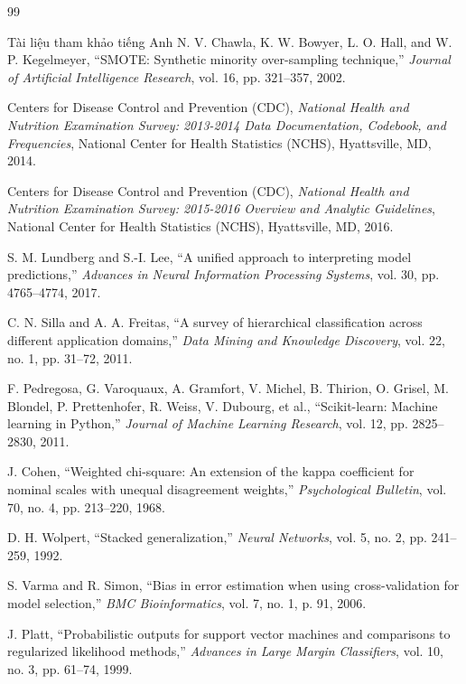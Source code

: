 \documentclass{uetgraduation}
\begin{document}
\begin{thebibliography}{99}
\begin{bibsection}{Tài liệu tham khảo tiếng Anh}
    N. V. Chawla, K. W. Bowyer, L. O. Hall, and W. P. Kegelmeyer,
    ``{SMOTE}: Synthetic minority over-sampling technique,''
    \textit{Journal of Artificial Intelligence Research}, vol. 16, pp. 321--357, 2002.

    Centers for Disease Control and Prevention (CDC),
    \textit{National Health and Nutrition Examination Survey: 2013-2014 Data Documentation, Codebook, and Frequencies},
    National Center for Health Statistics (NCHS), Hyattsville, MD, 2014.

    Centers for Disease Control and Prevention (CDC),
    \textit{National Health and Nutrition Examination Survey: 2015-2016 Overview and Analytic Guidelines},
    National Center for Health Statistics (NCHS), Hyattsville, MD, 2016.

    S. M. Lundberg and S.-I. Lee,
    ``A unified approach to interpreting model predictions,''
    \textit{Advances in Neural Information Processing Systems}, vol. 30, pp. 4765--4774, 2017.

    C. N. Silla and A. A. Freitas,
    ``A survey of hierarchical classification across different application domains,''
    \textit{Data Mining and Knowledge Discovery}, vol. 22, no. 1, pp. 31--72, 2011.

    F. Pedregosa, G. Varoquaux, A. Gramfort, V. Michel, B. Thirion, O. Grisel, M. Blondel, P. Prettenhofer, R. Weiss, V. Dubourg, et al.,
    ``Scikit-learn: Machine learning in Python,''
    \textit{Journal of Machine Learning Research}, vol. 12, pp. 2825--2830, 2011.

    J. Cohen,
    ``Weighted chi-square: An extension of the kappa coefficient for nominal scales with unequal disagreement weights,''
    \textit{Psychological Bulletin}, vol. 70, no. 4, pp. 213--220, 1968.

    D. H. Wolpert,
    ``Stacked generalization,''
    \textit{Neural Networks}, vol. 5, no. 2, pp. 241--259, 1992.

    S. Varma and R. Simon,
    ``Bias in error estimation when using cross-validation for model selection,''
    \textit{BMC Bioinformatics}, vol. 7, no. 1, p. 91, 2006.

    J. Platt,
    ``Probabilistic outputs for support vector machines and comparisons to regularized likelihood methods,''
    \textit{Advances in Large Margin Classifiers}, vol. 10, no. 3, pp. 61--74, 1999.


\end{bibsection}
\end{thebibliography}
\end{document}
